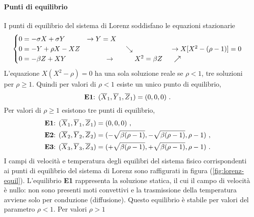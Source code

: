 \paragraph{Punti di equilibrio}
I punti di equilibrio del sistema di Lorenz soddisfano le equazioni stazionarie
\begin{equation}
    \begin{cases}
      0 = - \sigma X + \sigma Y  & \rightarrow Y = X \\
      0 = - Y + \rho X - X Z & \hspace{2.0cm} \searrow \hspace{2.0cm}\rightarrow  X[X^2-(\rho-1)] = 0 \\
      0 = - \beta Z + X Y  & \hspace{1.0cm} \rightarrow \hspace{1.0cm}  X^2 = \beta Z \hspace{0.5cm} \nearrow 
    \end{cases}
\end{equation}
L'equazione $X(X^2 - \rho) = 0$ ha una sola soluzione reale se $\rho < 1$, tre soluzioni
 per $\rho \geq 1$. Quindi per valori di $\rho < 1$ esiste un unico punto di equilibrio,
\begin{equation}
 \text{\textbf{E1}: } (\overline{X}_1, \overline{Y}_1, \overline{Z}_1) = (0,0,0) \ .
\end{equation}
Per valori di $\rho \geq 1$ esistono tre punti di equilibrio,
\begin{equation}
\begin{aligned}
 \text{\textbf{E1}: } &  (\overline{X}_1, \overline{Y}_1, \overline{Z}_1) = (0,0,0) \ , \\
 \text{\textbf{E2}: } &  (\overline{X}_2, \overline{Y}_2, \overline{Z}_2) =
 (-\sqrt{\beta(\rho-1)},-\sqrt{\beta(\rho-1)},\rho-1) \ , \\
 \text{\textbf{E3}: } &  (\overline{X}_3, \overline{Y}_3, \overline{Z}_3) =
 (+\sqrt{\beta(\rho-1)},+\sqrt{\beta(\rho-1)},\rho-1) \ .
\end{aligned}
\end{equation}
%
I campi di velocità e temperatura degli equilibri del sistema fisico
 corrispondenti ai punti di equilibrio del sistema di Lorenz sono raffigurati in
 figura (\ref{fig:lorenz-equil}). L'equilibrio \textbf{E1} rappresenta la soluzione
 statica, il cui il campo di velocità è nullo: non sono presenti moti convettivi
 e la trasmissione della temperatura avviene solo per conduzione (diffusione).
Questo equilibrio è stabile per valori del parametro $\rho<1$. Per valori $\rho > 1$
